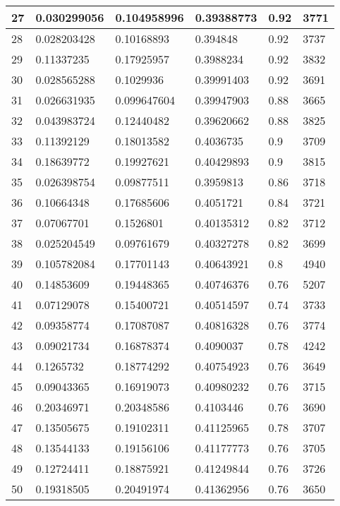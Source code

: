 \begin{longtable}{|l|l|l|l|l|l|}
27 & 0.030299056 & 0.104958996 & 0.39388773 & 0.92 & 3771 \\ \hline 
28 & 0.028203428 & 0.10168893 & 0.394848 & 0.92 & 3737 \\ \hline 
29 & 0.11337235 & 0.17925957 & 0.3988234 & 0.92 & 3832 \\ \hline 
30 & 0.028565288 & 0.1029936 & 0.39991403 & 0.92 & 3691 \\ \hline 
31 & 0.026631935 & 0.099647604 & 0.39947903 & 0.88 & 3665 \\ \hline 
32 & 0.043983724 & 0.12440482 & 0.39620662 & 0.88 & 3825 \\ \hline 
33 & 0.11392129 & 0.18013582 & 0.4036735 & 0.9 & 3709 \\ \hline 
34 & 0.18639772 & 0.19927621 & 0.40429893 & 0.9 & 3815 \\ \hline 
35 & 0.026398754 & 0.09877511 & 0.3959813 & 0.86 & 3718 \\ \hline 
36 & 0.10664348 & 0.17685606 & 0.4051721 & 0.84 & 3721 \\ \hline 
37 & 0.07067701 & 0.1526801 & 0.40135312 & 0.82 & 3712 \\ \hline 
38 & 0.025204549 & 0.09761679 & 0.40327278 & 0.82 & 3699 \\ \hline 
39 & 0.105782084 & 0.17701143 & 0.40643921 & 0.8 & 4940 \\ \hline 
40 & 0.14853609 & 0.19448365 & 0.40746376 & 0.76 & 5207 \\ \hline 
41 & 0.07129078 & 0.15400721 & 0.40514597 & 0.74 & 3733 \\ \hline 
42 & 0.09358774 & 0.17087087 & 0.40816328 & 0.76 & 3774 \\ \hline 
43 & 0.09021734 & 0.16878374 & 0.4090037 & 0.78 & 4242 \\ \hline 
44 & 0.1265732 & 0.18774292 & 0.40754923 & 0.76 & 3649 \\ \hline 
45 & 0.09043365 & 0.16919073 & 0.40980232 & 0.76 & 3715 \\ \hline 
46 & 0.20346971 & 0.20348586 & 0.4103446 & 0.76 & 3690 \\ \hline 
47 & 0.13505675 & 0.19102311 & 0.41125965 & 0.78 & 3707 \\ \hline 
48 & 0.13544133 & 0.19156106 & 0.41177773 & 0.76 & 3705 \\ \hline 
49 & 0.12724411 & 0.18875921 & 0.41249844 & 0.76 & 3726 \\ \hline 
50 & 0.19318505 & 0.20491974 & 0.41362956 & 0.76 & 3650 \\ \hline 
\end{longtable}